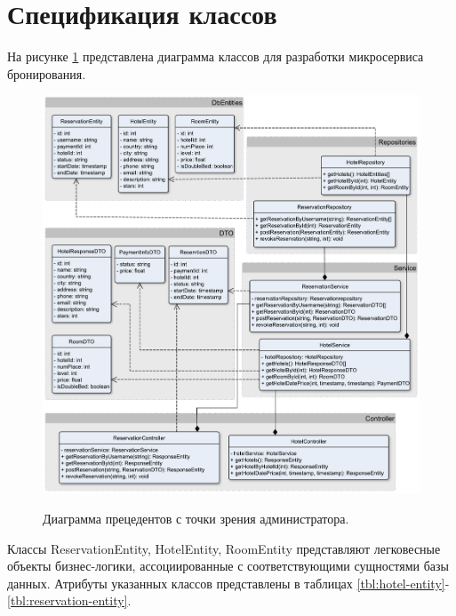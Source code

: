 \pagebreak

\section*{Спецификация классов}
На рисунке \ref{fig:diag-classes} представлена диаграмма классов для разработки микросервиса бронирования.

\begin{figure}[h!]
	\begin{center}
		{\includegraphics[scale = 0.58]{img/diag_classes/classes.pdf}}
		\caption{Диаграмма прецедентов с точки зрения администратора.}
		\label{fig:diag-classes}
	\end{center}
\end{figure} 

Классы ReservationEntity, HotelEntity, RoomEntity представляют легковесные объекты бизнес-логики, ассоциированные с соответствующими сущностями базы данных. Атрибуты указанных классов представлены в таблицах \ref{tbl:hotel-entity}-\ref{tbl:reservation-entity}.

